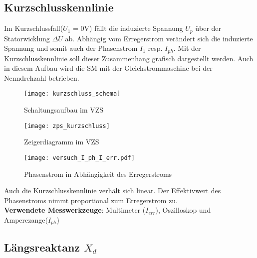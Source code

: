 \begin{flushleft}
\newpage






\subsection{Kurzschlusskennlinie}

Im Kurzschlussfall($U_1$ = 0V) fällt die induzierte Spannung $U_p$ über der Statorwicklung $\Delta U$ ab. Abhängig vom Erregerstrom verändert sich die induzierte Spannung und somit auch der Phasenstrom $I_1$ resp. $I_{ph}$.
Mit der Kurzschlusskennlinie soll dieser Zusammenhang grafisch dargestellt werden.
Auch in diesem Aufbau wird die SM mit der Gleichstrommaschine bei der Nenndrehzahl   betrieben.\\

\vspace{1cm}
 
 
\begin{figure}[H]
    \centering
        \texttt{[image: kurzschluss\_schema]}
    \caption{Schaltungsaufbau im VZS}
    \label{fig:SchaltungsaufbauKurzschlusskennlinie}
\end{figure}



\begin{figure}[H]
    \centering
        \texttt{[image: zps\_kurzschluss]}
    \caption{Zeigerdiagramm im VZS}
    \label{fig:ZeigerdiagrammKurzschlusskennlinie}
\end{figure}


\begin{figure}[H]
    \centering
        \texttt{[image: versuch\_I\_ph\_I\_err.pdf]}
    \caption{Phasenstrom in Abhängigkeit des Erregerstroms}
    \label{fig:Kurzschlusskennlinie}
\end{figure}

Auch die Kurzschlusskennlinie verhält sich linear. Der Effektivwert des Phasenstroms nimmt proportional zum Erregerstrom zu.\\

\vspace{0.4cm}
\textbf{Verwendete Messwerkzeuge}: Multimeter ($I_{err}$), Oszilloskop und Amperezange($I_{ph}$) 




\newpage
\subsection{Längsreaktanz $X_d$}


\end{flushleft}
